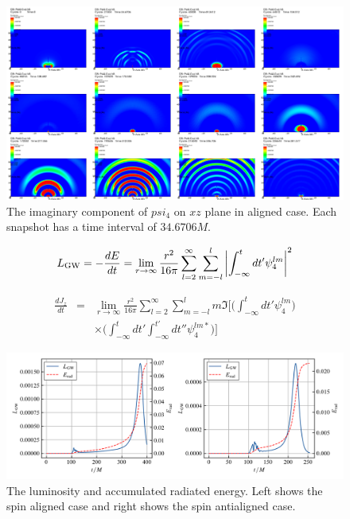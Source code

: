 \documentclass[noamssymb]{beamer}
\newlength{\colwidth}
\begin{document}
\begin{frame}[t]
\begin{columns}[t]
\begin{column}{\colwidth}
\begin{block}{}
  	\begin{figure}
  		\centering
  		\includegraphics[width=\columnwidth]{img/psi4i}
  		\caption{The imaginary component of $psi_4$ on $xz$ plane in aligned case. Each snapshot has a time interval of $34.6706M$.}
  	\end{figure}
	
	\begin{eqnarray}
		L_\mathrm{GW} = - \frac{dE}{dt} = \lim_{r\to\infty}{\frac{r^2}{16\pi}\sum_{l=2}^{\infty}\sum_{m=-l}^{l}\qty|\int_{-\infty}^{t}dt'\psi_4^{lm}|^2}
	\end{eqnarray}
	
	\begin{eqnarray}
		\frac{dJ_z}{dt}&=&\lim_{r\to\infty} \frac{r^2}{16\pi}\sum_{l=2}^{\infty}\sum_{m=-l}^{l}m \Im \biggl[\biggl(\int_{-\infty}^{t}dt'\psi_4^{lm}\biggr) \nonumber\\ &&\times \biggr( \int_{-\infty}^tdt'\int_{-\infty}^{t'}dt''\psi_4^{lm\ast} \biggr)\biggr]
	\end{eqnarray}
	
	\begin{figure}
		\centering
		\includegraphics[width=\columnwidth]{img/erad}
		\caption{The luminosity and accumulated radiated energy. Left shows the spin aligned case and right shows the spin antialigned case.}
	\end{figure}
	

\end{block}
\end{column}
\end{columns}
\end{frame}
\end{document}
